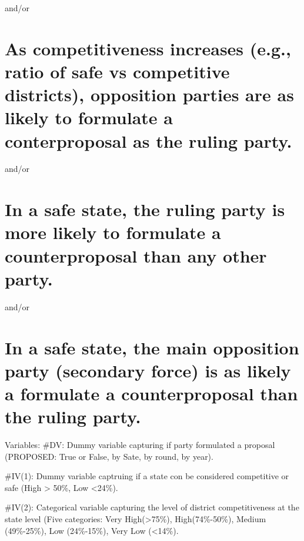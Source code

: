 \documentclass[]{article}
\begin{document}
and/or

\hypertarget{as-competitiveness-increases-e.g.-ratio-of-safe-vs-competitive-districts-opposition-parties-are-as-likely-to-formulate-a-conterproposal-as-the-ruling-party.}{%
\section{As competitiveness increases (e.g., ratio of safe vs
competitive districts), opposition parties are as likely to formulate a
conterproposal as the ruling
party.}\label{as-competitiveness-increases-e.g.-ratio-of-safe-vs-competitive-districts-opposition-parties-are-as-likely-to-formulate-a-conterproposal-as-the-ruling-party.}}

and/or

\hypertarget{in-a-safe-state-the-ruling-party-is-more-likely-to-formulate-a-counterproposal-than-any-other-party.}{%
\section{In a safe state, the ruling party is more likely to formulate a
counterproposal than any other
party.}\label{in-a-safe-state-the-ruling-party-is-more-likely-to-formulate-a-counterproposal-than-any-other-party.}}

and/or

\hypertarget{in-a-safe-state-the-main-opposition-party-secondary-force-is-as-likely-a-formulate-a-counterproposal-than-the-ruling-party.}{%
\section{In a safe state, the main opposition party (secondary force) is
as likely a formulate a counterproposal than the ruling
party.}\label{in-a-safe-state-the-main-opposition-party-secondary-force-is-as-likely-a-formulate-a-counterproposal-than-the-ruling-party.}}

Variables: \#DV: Dummy variable capturing if party formulated a proposal
(PROPOSED: True or False, by Sate, by round, by year).

\#IV(1): Dummy variable captruing if a state con be considered
competitive or safe (High \textgreater{} 50\%, Low \textless{}24\%).

\#IV(2): Categorical variable capturing the level of district
competitiveness at the state level (Five categories: Very
High(\textgreater{}75\%), High(74\%-50\%), Medium (49\%-25\%), Low
(24\%-15\%), Very Low (\textless{}14\%).
\end{document}
